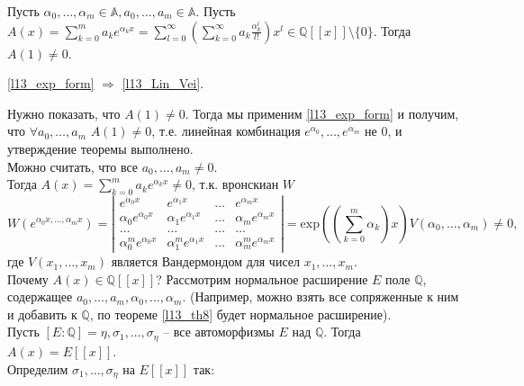 \begin{theorem} \label{l13_exp_form}
	Пусть $\alpha_0, \ldots, \alpha_m \in \mathbb{A}, a_0, \ldots, a_m \in \mathbb{A}$. Пусть $\displaystyle A(x) = \sum_{k = 0}^{m} a_k e^{\alpha_k x} = \sum_{l = 0}^{\infty} \left( \sum_{k = 0}^{\infty} a_k \frac{\alpha_k^l}{l!} \right)x^l \in \mathbb{Q}[[x]] \setminus \lbrace 0 \rbrace$. 
	Тогда $A(1) \ne 0$.
\end{theorem}

\begin{theorem} \label{l13_th10}
	\ref{l13_exp_form} $\Rightarrow$ \ref{l13_Lin_Vei}.
\end{theorem}
\begin{pf}
	Нужно показать, что $A(1) \ne 0$. Тогда мы применим \ref{l13_exp_form} и получим, что $\forall a_0, \ldots, a_m$ $A(1) \ne 0$, т.е. линейная комбинация $e^{\alpha_0}, \ldots, e^{\alpha_m}$ не 0, и утверждение теоремы выполнено.\\
	Можно считать, что все $a_0, \ldots, a_m \ne 0$.\\
	Тогда $\displaystyle A(x) = \sum_{k = 0}^{m} a_k e^{\alpha_k x} \ne 0$, т.к. вронскиан $W$\\
 	\[ W(e^{\alpha_0 x, \ldots, \alpha_m x}) = \left| 
 	\begin{array}{cccc}
		e^{\alpha_0 x}       & e^{\alpha_1 x}   & \ldots & e^{\alpha_m x}  \\
    	\alpha_0 e^{\alpha_0 x}       & \alpha_1 e^{\alpha_1 x}   & \ldots & \alpha_m e^{\alpha_m x} \\
    	\ldots & \ldots & \ldots & \ldots \\
    	\alpha_0^m e^{\alpha_0 x}       & \alpha_1^m e^{\alpha_1 x}   & \ldots & \alpha_m^m e^{\alpha_m x}
    \end{array} \right|  = \mathrm{exp}\left(\left(\sum_{k=0}^{m} \alpha_k\right)x\right)  V(\alpha_0, \ldots, \alpha_m) \ne 0,\] 
    где $V(x_1, \ldots, x_m)$ является Вандермондом для чисел $x_1, \ldots, x_m$.\\
    Почему $A(x) \in \mathbb{Q}[[x]]$? Рассмотрим нормальное расширение $E$ поле $\mathbb{Q}$, содержащее $a_0, \ldots, a_m, \alpha_0, \ldots, \alpha_m$. (Например, можно взять все сопряженные к ним и добавить к $\mathbb{Q}$, по теореме \ref{l13_th8} будет нормальное расширение).\\
    Пусть $[E : \mathbb{Q}] = \eta, \sigma_1, \ldots, \sigma_{\eta}$ -- все автоморфизмы $E$ над $\mathbb{Q}$. Тогда $A(x) = E[[x]]$.\\
    Определим $\sigma_1, \ldots, \sigma_{\eta}$ на $E[[x]]$ так:

\end{pf}
